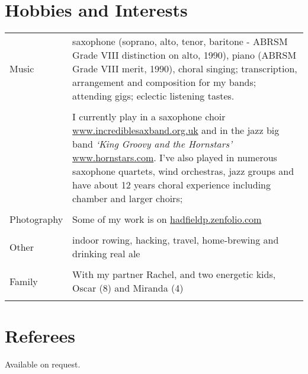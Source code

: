 \documentclass[margin = 0cm,line]{resume}
\begin{document}
\begin{resume}
    \section{\mysidestyle Hobbies and Interests}
    \vspace{1.5mm}
	\begin{table}[ht]
        \begin{tabular}{p{2cm} p{12cm}}
        {Music}&{saxophone (soprano, alto, tenor, baritone - ABRSM Grade VIII distinction on alto, 1990), piano
	           (ABRSM Grade VIII merit, 1990), choral singing; transcription, arrangement and composition for my bands;
	           attending gigs; eclectic listening tastes.}\\
                                                                                                      \vspace{0.5mm}\\%
		{}&{I currently play in a saxophone choir \url{www.incrediblesaxband.org.uk} and in the jazz big band
		\textsl{`King Groovy and the Hornstars'} \url{www.hornstars.com}.  I've also played in numerous saxophone
		quartets, wind orchestras, jazz groups and have about 12 years choral experience including chamber and larger
		choirs;}\\                                                                                    \vspace{0.5mm}\\%
	    {Photography}&{Some of my work is on \url{hadfieldp.zenfolio.com}}\\
                                                                                                      \vspace{0.5mm}\\%
		{Other}&{indoor rowing, hacking, travel, home-brewing and drinking real ale}\\                \vspace{0.5mm}\\%
		{Family}&{With my partner Rachel, and two energetic kids, Oscar (8) and Miranda (4)}\\        \vspace{0.5mm}\\%
        \end{tabular}
	\end{table}

    \section{\mysidestyle Referees} 

    Available on request.

\end{resume}
\end{document}
